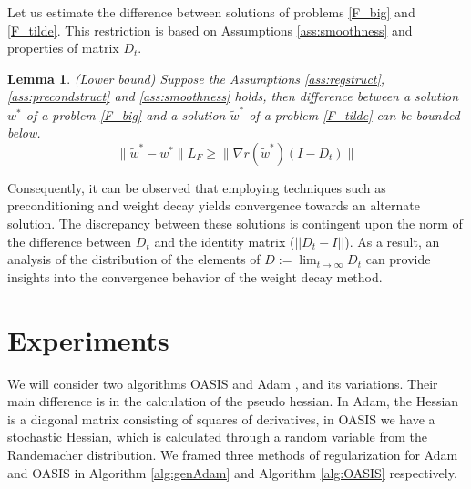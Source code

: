 \documentclass[USenglish]{article}
\theoremstyle{dgthm}
\newtheorem{lemma}{Lemma}
\theoremstyle{dgdef}
\begin{document}
Let us estimate the difference between solutions of problems \eqref{F_big} and \eqref{F_tilde}. This restriction is based on Assumptions \eqref{ass:smoothness} and properties of matrix $D_t$.

\begin{lemma}\label{lemma:lowerbondF}{(Lower bound)}
Suppose the Assumptions \ref{ass:regstruct}, \ref{ass:precondstruct} and \ref{ass:smoothness} holds, then difference between a solution $w^*$ of a problem \eqref{F_big} and a solution $\widetilde{w}^*$ of a problem \eqref{F_tilde} can be bounded below.
    \begin{equation*}
        \|\widetilde{w}^* - w^* \| L_F \geq \| \nabla r (\widetilde{w}^*) (I - D_t)\|
    \end{equation*}
\end{lemma}

Consequently, it can be observed that employing techniques such as preconditioning and weight decay yields convergence towards an alternate solution.
The discrepancy between these solutions is contingent upon the norm of the difference between $D_t$ and the identity matrix ($||D_t - I||$).
As a result, an analysis of the distribution of the elements of $D := \lim_{t \to \infty} D_t$ can provide insights into the convergence behavior of the weight decay method.


\section{Experiments}
\label{subsec:experiments}

We will consider two algorithms OASIS \citep{goldberg2011oasis} and Adam \citep{kingma2014adam}, and its variations. Their main difference is in the calculation of the pseudo hessian.
In Adam, the Hessian is a diagonal matrix consisting of squares of derivatives, in OASIS we have a stochastic Hessian, which is calculated through a random variable from the Randemacher distribution. 
We framed three methods of regularization for Adam and OASIS in Algorithm \ref{alg:genAdam} and Algorithm \ref{alg:OASIS} respectively.
\end{document}
